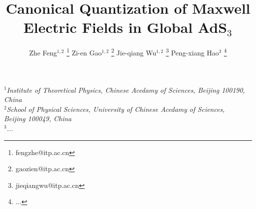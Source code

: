 \title{\textbf{Canonical Quantization of Maxwell Electric Fields in Global AdS$_3$}}

\author{
Zhe Feng${}^{1,2}$ \footnote{fengzhe@itp.ac.cn}
Zi-en Gao${}^{1,2}$ \footnote{gaozien@itp.ac.cn}
Jie-qiang Wu${}^{1,2}$ \footnote{jieqiangwu@itp.ac.cn}
Peng-xiang Hao${}^{3}$ \footnote{...}
}

\date{}

\maketitle

\begin{center}
{\it
$^{1}$Institute of Theoretical Physics, Chinese Acedamy of Sciences, Beijing 100190, China \\
$^{2}$School of Physical Sciences, University of Chinese Acedamy of Sciences, \\ Beijing 100049, China\\
$^{3}$...
}
\end{center}

\vspace{10mm}
